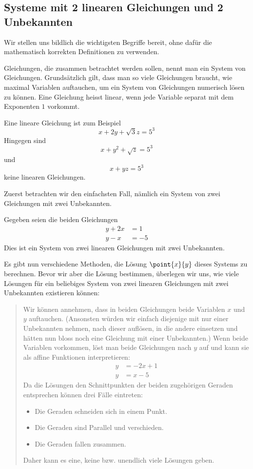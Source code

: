 \documentclass[%
11pt,%
twoside,%
titlepage,%
german,%
headsepline%
]{scrartcl}
\begin{document}
\subsection{Systeme mit 2 linearen Gleichungen und 2 Unbekannten}
Wir stellen uns bildlich die wichtigsten Begriffe bereit, ohne daf\"ur die mathematisch korrekten Definitionen zu verwenden.

Gleichungen, die zusammen betrachtet werden sollen, nennt man ein System von Gleichungen. Grunds\"atzlich gilt, dass man so viele Gleichungen braucht, wie maximal Variablen auftauchen, um ein System von Gleichungen numerisch l\"osen zu k\"onnen. Eine Gleichung heisst linear, wenn jede Variable separat mit dem Exponenten $1$ vorkommt.
\begin{bsp}
Eine lineare Gleichung ist zum Beispiel
$$x+2y+\sqrt{3}z=5^3$$
Hingegen sind
$$x+y^2+\sqrt{z}=5^3$$
und
$$x+yz=5^3$$
keine linearen Gleichungen.
\end{bsp}

Zuerst betrachten wir den einfachsten Fall, n\"amlich ein System von zwei Gleichungen mit zwei Unbekannten.
\begin{bsp}
Gegeben seien die beiden Gleichungen
\begin{align}
y+2x&=1\\
y-x&=-5
\end{align}
Dies ist ein System von zwei linearen Gleichungen mit zwei Unbekannten.
\end{bsp}
Es gibt nun verschiedene Methoden, die L\"osung $\point{x}{y}$ dieses Systems zu berechnen. Bevor wir aber die L\"osung bestimmen, \"uberlegen wir uns, wie viele L\"osungen f\"ur ein beliebiges System von zwei linearen Gleichungen mit zwei Unbekannten existieren k\"onnen:
\begin{quote}
Wir k\"onnen annehmen, dass in beiden Gleichungen beide Variablen $x$ und $y$ auftauchen. (Ansonsten w\"urden wir einfach diejenige mit nur einer Unbekannten nehmen, nach dieser  aufl\"osen, in die andere einsetzen und h\"atten nun bloss noch eine Gleichung mit einer Unbekannten.) Wenn beide Variablen vorkommen, l\"ost man beide Gleichungen nach $y$ auf und kann sie als affine Funktionen interpretieren:
\begin{align}
y&=-2x+1\tag{$1'$}\\
y&=x-5\tag{$2'$}
\end{align}
Da die L\"osungen den Schnittpunkten der beiden zugeh\"origen Geraden entsprechen k\"onnen drei F\"alle eintreten:
\begin{itemize}
\item Die Geraden schneiden sich in einem Punkt.
\item Die Geraden sind Parallel und verschieden.
\item Die Geraden fallen zusammen.
\end{itemize}
\noindent Daher kann es eine, keine bzw. unendlich viele L\"osungen geben.
\end{quote}
\end{document}
